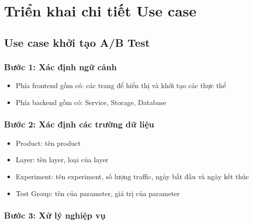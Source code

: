 

\section{Triển khai chi tiết Use case}

\subsection{Use case khởi tạo A/B Test}

\subsubsection{Bước 1: Xác định ngữ cảnh}

\begin{itemize}
	\item Phía frontend gồm có: các trang để hiển thị và khởi tạo các thực thể
	\item Phía backend gồm có: Service, Storage, Database
\end{itemize}

\subsubsection{Bước 2: Xác định các trường dữ liệu}

\begin{itemize}
	\item Product: tên product
	\item Layer: tên layer, loại của layer
	\item Experiment: tên experiment, số lượng traffic, ngày bắt đầu và ngày kết thúc
	\item Test Group: tên của parameter, giá trị của parameter
\end{itemize}

\subsubsection{Bước 3: Xử lý nghiệp vụ}

